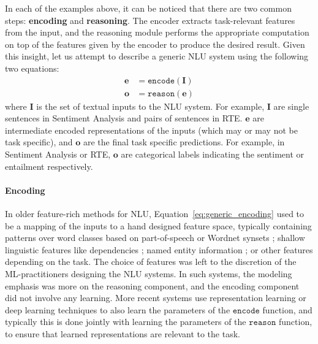 In each of the examples above, it can be noticed that there are two common steps: \textbf{encoding}
and \textbf{reasoning}. The encoder extracts task-relevant features from the input, and the
reasoning module performs the appropriate computation on top of the features given by the encoder to
produce the desired result. Given this insight, let us attempt to describe a generic NLU system
using the following two equations: \begin{align} \mathbf{e} &= \mathtt{encode}(\mathbf{I})
\label{eq:generic_encoding}\\ \mathbf{o} &= \mathtt{reason}(\mathbf{e}) \label{eq:generic_reasoning}
\end{align} where $\mathbf{I}$ is the set of textual inputs to the NLU system.  For example,
$\mathbf{I}$  are single sentences in Sentiment Analysis and pairs of sentences in RTE\@.
$\textbf{e}$ are intermediate encoded representations of the inputs (which may or may not be task
specific), and $\mathbf{o}$ are the final task specific predictions. For example, in Sentiment
Analysis or RTE, $\mathbf{o}$ are categorical labels indicating the sentiment or entailment
respectively.

\paragraph{Encoding} In older feature-rich methods for NLU, Equation~\ref{eq:generic_encoding} used
to be a mapping of the inputs to a hand designed feature space, typically containing patterns over
word classes based on part-of-speech \citep{corley2005measuring} or Wordnet synsets
\citep{moldovan2001logic}; shallow linguistic features like dependencies \citep{bos2005recognising};
named entity information \citep{tatu2005semantic}; or other features depending on the task. The
choice of features was left to the discretion of the ML-practitioners designing the NLU systems. In
such systems, the modeling emphasis was more on the reasoning component, and the encoding component
did not involve any learning.  More recent systems \citep[among many
others]{bahdanau:14,weston2014memory,hermann2015teaching,Xiong2016DynamicMN,bowman2016fast,yang:16}
use representation learning or deep learning techniques to also learn the parameters of the
$\mathtt{encode}$ function, and typically this is done jointly with learning the parameters of the
$\mathtt{reason}$ function, to ensure that learned representations are relevant to the task.

